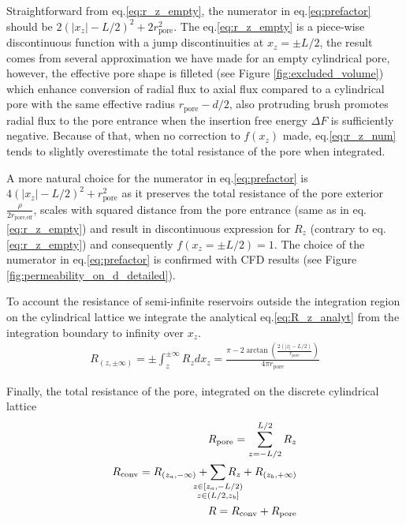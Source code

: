 \documentclass[10pt, a4paper]{article}
\begin{document}
\begin{multicols}{2}
Straightforward from eq.\ref{eq:r_z_empty}, the numerator in eq.\ref{eq:prefactor} should be $2(|x_z|-L/2)^2 + 2r_{\textrm{pore}}^2$.
The eq.\ref{eq:r_z_empty} is a piece-wise discontinuous function with a jump discontinuities at $x_z = \pm L/2$, the result comes from several approximation we have made for an empty cylindrical pore, however, the effective pore shape is filleted (see Figure \ref{fig:excluded_volume}) which enhance conversion of radial flux to axial flux compared to a cylindrical pore with the same effective radius $r_{\textrm{pore}} - d/2$, also protruding brush promotes radial flux to the pore entrance when the insertion free energy $\Delta F$ is sufficiently negative.
Because of that, when no correction to $f(x_z)$ made, eq.\ref{eq:r_z_num} tends to slightly overestimate the total resistance of the pore when integrated.

A more natural choice for the numerator in eq.\ref{eq:prefactor}  is $4(|x_z|-L/2)^2 + r_{\textrm{pore}}^2$ as it preserves the total resistance of the pore exterior $\frac{\rho}{2r_{\textrm{pore,eff}}}$, scales with squared distance from the pore entrance (same as in eq.\ref{eq:r_z_empty}) and result in discontinuous expression for $R_z$ (contrary to eq.\ref{eq:r_z_empty}) and consequently $f(x_z = \pm L/2) = 1$.
The choice of the numerator in eq.\ref{eq:prefactor} is confirmed with CFD results (see Figure \ref{fig:permeability_on_d_detailed}).

To account the resistance of semi-infinite reservoirs outside the integration region on the cylindrical lattice we integrate the analytical eq.\ref{eq:R_z_analyt} from the integration boundary to infinity over $x_z$.
\begin{eqnarray}
    \label{eq:r_reservoir}
    R_{(z, \pm\infty)} = \pm \int_{z}^{\pm\infty} R_z dx_z= \frac{\pi - 2\arctan\left(\frac{2(|z|-L/2)}{r_{\textrm{pore}}}\right)}{4\pi r_{\textrm{pore}}}
\end{eqnarray}

Finally, the total resistance of the pore, integrated on the discrete cylindrical lattice
\begin{eqnarray}
    R_{\textrm{pore}} = \sum_{z=-L/2}^{L/2} R_z
    \\
    R_{\textrm{conv}} = R_{(z_{a}, -\infty)} + \sum\limits_{\mathclap{\substack{z \in [z_{a},-L/2)\\z \in (L/2, z_b]}}} R_z + R_{(z_{b}, +\infty)}
    \\
    R = R_{\textrm{conv}} + R_{\textrm{pore}}
\end{eqnarray}

\end{multicols}
\end{document}
